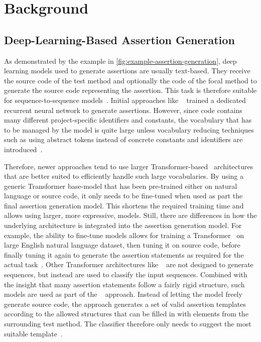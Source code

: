 
\section{Background}


\subsection{Deep-Learning-Based Assertion Generation}

As demonstrated by the example in
\cref{fig:example-assertion-generation}, deep learning models used to
generate assertions are usually text-based. They receive the source
code of the test method and optionally the code of the focal method to
generate the source code representing the assertion.
This task is therefore suitable for sequence-to-sequence
models~\cite{Britz2017}. Initial approaches like
\atlas~\cite{Watson2020} trained a dedicated recurrent neural network
to generate assertions. However, since code contains many different
project-specific identifiers and constants, the vocabulary that has to
be managed by the model is quite large unless vocabulary reducing
techniques such as using abstract tokens instead of concrete constants
and identifiers are introduced~\cite{Watson2020}.

Therefore, newer approaches tend to use larger
Transformer-based~\cite{Vaswani2017} architectures that are better
suited to efficiently handle such large vocabularies. By using a
generic Transformer base-model that has been pre-trained either on
natural language or source code, it only needs to be fine-tuned when
used as part the final assertion generation model. This shortens the
required training time and allows using larger, more expressive,
models.
Still, there are differences in how the underlying architecture is
integrated into the assertion generation model.
For example, the ability to fine-tune models allows for training a
\bart Transformer~\cite{Lewis2020} on large English natural language
dataset, then tuning it on source code, before finally tuning it again
to generate the assertion statements as required for the actual
task~\cite{Tufano2022}.
Other Transformer architectures like \bert~\cite{Devlin2019} are not
designed to generate sequences, but instead are used to classify the
input sequences. Combined with the insight that many assertion
statements follow a fairly rigid structure, such models are used as
part of the \toga~\cite{Dinella2022} approach. Instead of letting the
model freely generate source code, the approach generates a set of
valid assertion templates according to the allowed structures that can
be filled in with elements from the surrounding test method. The \bert
classifier therefore only needs to suggest the most suitable
template~\cite{Dinella2022}.


